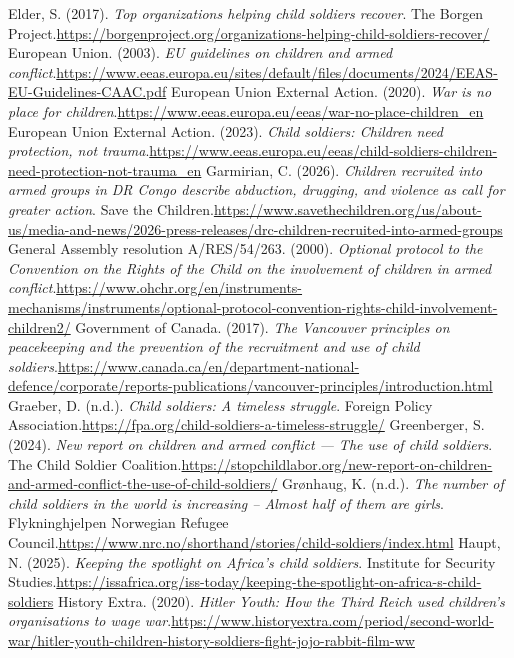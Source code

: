 \begin{referencelist}
   Elder, S. (2017). \emph{Top organizations helping child soldiers recover}. The Borgen Project.\url{https://borgenproject.org/organizations-helping-child-soldiers-recover/}
   European Union. (2003). \emph{EU guidelines on children and armed conflict}.\url{https://www.eeas.europa.eu/sites/default/files/documents/2024/EEAS-EU-Guidelines-CAAC.pdf}
   European Union External Action. (2020). \emph{War is no place for children}.\url{https://www.eeas.europa.eu/eeas/war-no-place-children_en}
   European Union External Action. (2023). \emph{Child soldiers: Children need protection, not trauma}.\url{https://www.eeas.europa.eu/eeas/child-soldiers-children-need-protection-not-trauma_en}
   Garmirian, C. (2026). \emph{Children recruited into armed groups in DR Congo describe abduction, drugging, and violence as call for greater action}. Save the Children.\url{https://www.savethechildren.org/us/about-us/media-and-news/2026-press-releases/drc-children-recruited-into-armed-groups}
   General Assembly resolution A/RES/54/263. (2000). \emph{Optional protocol to the Convention on the Rights of the Child on the involvement of children in armed conflict}.\url{https://www.ohchr.org/en/instruments-mechanisms/instruments/optional-protocol-convention-rights-child-involvement-children2/}
   Government of Canada. (2017). \emph{The Vancouver principles on peacekeeping and the prevention of the recruitment and use of child soldiers}.\url{https://www.canada.ca/en/department-national-defence/corporate/reports-publications/vancouver-principles/introduction.html}
   Graeber, D. (n.d.). \emph{Child soldiers: A timeless struggle}. Foreign Policy Association.\url{https://fpa.org/child-soldiers-a-timeless-struggle/}
   Greenberger, S. (2024). \emph{New report on children and armed conflict — The use of child soldiers}. The Child Soldier Coalition.\url{https://stopchildlabor.org/new-report-on-children-and-armed-conflict-the-use-of-child-soldiers/}
   Grønhaug, K. (n.d.). \emph{The number of child soldiers in the world is increasing – Almost half of them are girls}. Flykninghjelpen Norwegian Refugee Council.\url{https://www.nrc.no/shorthand/stories/child-soldiers/index.html}
   Haupt, N. (2025). \emph{Keeping the spotlight on Africa’s child soldiers}. Institute for Security Studies.\url{https://issafrica.org/iss-today/keeping-the-spotlight-on-africa-s-child-soldiers}
   History Extra. (2020). \emph{Hitler Youth: How the Third Reich used children’s organisations to wage war}.\url{https://www.historyextra.com/period/second-world-war/hitler-youth-children-history-soldiers-fight-jojo-rabbit-film-ww}

\end{referencelist}
